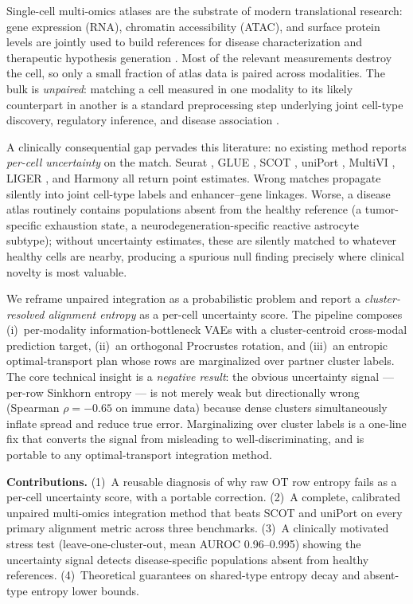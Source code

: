 \documentclass{article}
\theoremstyle{plain}
\begin{document}
Single-cell multi-omics atlases are the substrate of modern translational research: gene expression (RNA), chromatin accessibility (ATAC), and surface protein levels are jointly used to build references for disease characterization and therapeutic hypothesis generation \citep{regev2017hca,rozenblatt2020htan,stephenson2021single,hubmap2019}. Most of the relevant measurements destroy the cell, so only a small fraction of atlas data is paired across modalities. The bulk is \emph{unpaired}: matching a cell measured in one modality to its likely counterpart in another is a standard preprocessing step underlying joint cell-type discovery, regulatory inference, and disease association \citep{demetci2022scot,cao2022multi,cao2022uniport,hao2024seurat5}.

A clinically consequential gap pervades this literature: no existing method reports \emph{per-cell uncertainty} on the match. Seurat \citep{hao2024seurat5}, GLUE \citep{cao2022multi}, SCOT \citep{demetci2022scot}, uniPort \citep{cao2022uniport}, MultiVI \citep{ashuach2023multivi}, LIGER \citep{welch2019liger}, and Harmony \citep{korsunsky2019harmony} all return point estimates. Wrong matches propagate silently into joint cell-type labels and enhancer--gene linkages. Worse, a disease atlas routinely contains populations absent from the healthy reference (a tumor-specific exhaustion state, a neurodegeneration-specific reactive astrocyte subtype); without uncertainty estimates, these are silently matched to whatever healthy cells are nearby, producing a spurious null finding precisely where clinical novelty is most valuable.

We reframe unpaired integration as a probabilistic problem and report a \emph{cluster-resolved alignment entropy} as a per-cell uncertainty score. The pipeline composes (i)~per-modality information-bottleneck VAEs with a cluster-centroid cross-modal prediction target, (ii)~an orthogonal Procrustes rotation, and (iii)~an entropic optimal-transport plan whose rows are marginalized over partner cluster labels. The core technical insight is a \emph{negative result}: the obvious uncertainty signal --- per-row Sinkhorn entropy --- is not merely weak but directionally wrong (Spearman $\rho=-0.65$ on immune data) because dense clusters simultaneously inflate spread and reduce true error. Marginalizing over cluster labels is a one-line fix that converts the signal from misleading to well-discriminating, and is portable to any optimal-transport integration method.

\textbf{Contributions.} (1)~A reusable diagnosis of why raw OT row entropy fails as a per-cell uncertainty score, with a portable correction. (2)~A complete, calibrated unpaired multi-omics integration method that beats SCOT and uniPort on every primary alignment metric across three benchmarks. (3)~A clinically motivated stress test (leave-one-cluster-out, mean AUROC 0.96--0.995) showing the uncertainty signal detects disease-specific populations absent from healthy references. (4)~Theoretical guarantees on shared-type entropy decay and absent-type entropy lower bounds.
\end{document}
